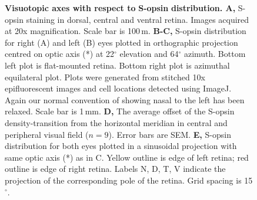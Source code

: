 \documentclass[10pt]{article}
\begin{document}
\begin{figure}[!ht]\caption{
\textbf{Visuotopic axes with respect to
}\textbf{S-opsin}\textbf{ distribution. A,} S-opsin staining in
dorsal, central and ventral retina. Images acquired at 20x
magnification. Scale bar is 100\,{\textmu}m.\textbf{ B-C, }S-opsin
distribution for right (A) and left (B) eyes plotted in orthographic
projection centred on optic axis (*) at 22$^{\circ}$ elevation and
64$^{\circ}$ azimuth. Bottom left plot is flat-mounted retina. Bottom
right plot is azimuthal equilateral plot. Plots were generated from
stitched 10x epifluorescent images and cell locations detected using
ImageJ. Again our normal convention of showing nasal to the left has
been relaxed. Scale bar is 1\,mm.\textbf{ D,} The average offset of
the S-opsin density-transition from the horizontal meridian in
central and peripheral visual field ($n=9$). Error bars are
SEM. \textbf{E,} S-opsin distribution for both eyes plotted in a
sinusoidal projection with same optic axis (*) as in C. Yellow
outline is edge of left retina; red outline is edge of right retina. 
Labels N, D, T, V indicate the projection of the corresponding pole
of the retina. Grid spacing is 15$^{\circ}$. 
}\end{figure}
\end{document}
